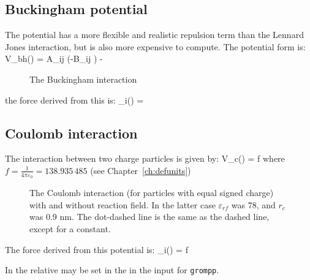 \subsection{Buckingham potential}
The  
potential has a more flexible and realistic repulsion term
than the Lennard Jones interaction, but is also more expensive to
compute. The potential form is:
\beq
V_{bh}(\rij) = A_{ij} \exp(-B_{ij} \rij) -
\eeq
\begin {figure}[ht]
\centerline{}
\caption {The Buckingham interaction}
\label{fig:bham}
\end {figure}

the force derived from this is:
\beq
 _i(\rij) =  \rnorm
\eeq

\subsection{Coulomb interaction}
\label{sec:coul}
\newcommand{\epsr}{\varepsilon_r}
\newcommand{\epsrf}{\varepsilon_{rf}}
The  interaction between two charge particles is given by:
\beq
V_c(\rij) = f \frac{q_i q_j}{\epsr \rij}
\eeq
where $f = \frac{1}{4\pi \varepsilon_0} = 138.935\,485$ (see Chapter~\ref{ch:defunits})
\begin {figure}[ht]
\centerline{}
\caption{The Coulomb interaction (for particles with equal signed
charge) with and without reaction field. In the latter case $\epsrf$
was 78, and $r_c$ was 0.9 nm. The dot-dashed line is the same as the
dashed line, except for a constant.}
\label{fig:coul}
\end {figure}

The force derived from this potential is:
\beq
{}_i(\rvij) = f \frac{q_i q_j}{\epsr\rij^2}\rnorm
\eeq

In {\gromacs} the  relative  
\normindex{$\epsr$}
may be set in the in the input for {\tt grompp}. 

